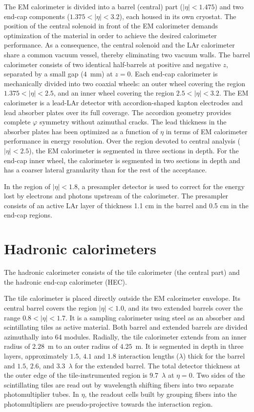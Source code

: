 The EM calorimeter is divided into a barrel (central) part ($|\eta| < 1.475$) and two end-cap components
($1.375 < |\eta| < 3.2$), each housed in its own cryostat. The position of the central solenoid in
front of the EM calorimeter demands optimization of the material in order to achieve the desired calorimeter
performance. As a consequence, the central solenoid and the LAr calorimeter
share a common vacuum vessel, thereby eliminating two vacuum walls. The barrel calorimeter
consists of two identical half-barrels at positive and negative $z$, separated by a small gap ($4$~mm) at $z = 0$. Each end-cap
calorimeter is mechanically divided into two coaxial wheels: an outer wheel covering the region
$1.375 < |\eta| < 2.5$, and an inner wheel covering the region $2.5 < |\eta| < 3.2$. The EM calorimeter is
a lead-LAr detector with accordion-shaped kapton electrodes and lead absorber plates over its full
coverage. The accordion geometry provides complete $\varphi$ symmetry without azimuthal cracks. The lead thickness in the absorber plates has been optimized as a function of $\eta$ in terms of EM calorimeter performance in energy resolution. Over the region devoted to central analysis ($|\eta| < 2.5$), the
EM calorimeter is segmented in three sections in depth. For the end-cap inner wheel, the calorimeter is segmented in two sections in depth and has a coarser lateral granularity than for the rest of the acceptance.

In the region of $|\eta| < 1.8$, a presampler detector is used to correct for the energy lost by
electrons and photons upstream of the calorimeter. The presampler consists of an active LAr layer
of thickness 1.1 cm in the barrel and 0.5 cm in the end-cap regions.


\section{Hadronic calorimeters}
\label{sec:ATLAS_H_calo}


The hadronic calorimeter consists of the tile calorimeter (the central part) and the hadronic end-cap calorimeter (HEC).

The tile calorimeter is placed directly outside the EM calorimeter envelope. Its
central barrel covers the region $|\eta| < 1.0$, and its two extended barrels cover the range $0.8 < |\eta| < 1.7$. It is a
sampling calorimeter using steel as an absorber and scintillating tiles as active material. Both
barrel and extended barrels are divided azimuthally into 64 modules. Radially, the tile calorimeter
extends from an inner radius of $2.28$~m to an outer radius of $4.25$~m. It is segmented in depth in three
layers, approximately $1.5$, $4.1$ and $1.8$ interaction lengths ($\lambda$) thick for the barrel and $1.5$, $2.6$, and
$3.3$~$\lambda$ for the extended barrel. The total detector thickness at the outer edge of the tile-instrumented
region is $9.7$~$\lambda$ at $\eta=0$. Two sides of the scintillating tiles are read out by wavelength shifting
fibers into two separate photomultiplier tubes. In $\eta$, the readout cells built by grouping fibers into
the photomultipliers are pseudo-projective towards the interaction region.

